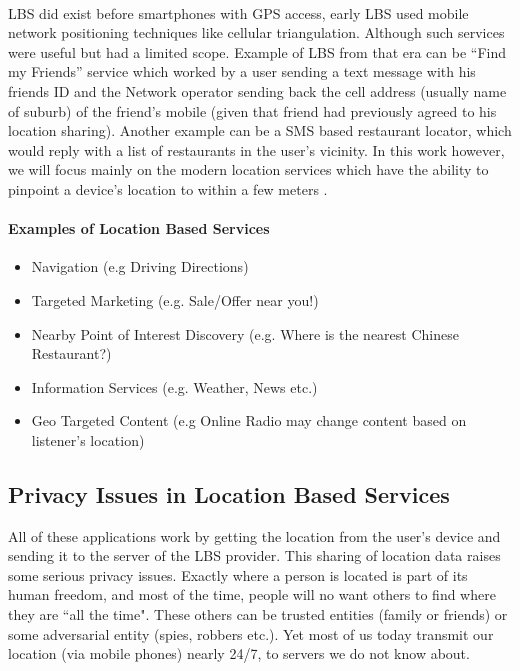 \documentclass[12pt]{report}
\begin{document}
\paragraph{}
LBS did exist before smartphones with GPS access, early LBS \cite{lbsShu} used mobile network positioning techniques like cellular triangulation. Although such services were useful but had a limited scope. Example of LBS from that era can be “Find my Friends” service which worked by a user sending a text message with his friends ID and the Network operator sending back the cell address (usually name of suburb) of the friend’s mobile (given that friend had previously agreed to his location sharing). Another example can be a SMS based restaurant locator, which would reply with a list of restaurants in the user’s vicinity. In this work however, we will focus mainly on the modern location services which have the ability to pinpoint a device's location to within a few meters \cite{ TGIS:TGIS1152}.
\paragraph{Examples of Location Based Services}
\begin{itemize}
\item Navigation (e.g Driving Directions)
\item Targeted Marketing (e.g. Sale/Offer near you!)
\item Nearby Point of Interest Discovery (e.g. Where is the nearest Chinese Restaurant?)
\item Information Services (e.g. Weather, News etc.)
\item Geo Targeted Content (e.g Online Radio may change content based on listener's location)
\end{itemize}

\subsection{Privacy Issues in Location Based Services}
All of these applications work by getting the location from the user's device and sending it to the server of the LBS provider. This sharing of location data raises some serious privacy issues. Exactly where a person is located is part of its human freedom, and most of the time, people will no want others to find where they are ``all the time". These others can be trusted entities (family or friends) or some adversarial entity (spies, robbers etc.). Yet most of us today transmit our location (via mobile phones) nearly 24/7, to servers we do not know about.
\end{document}
